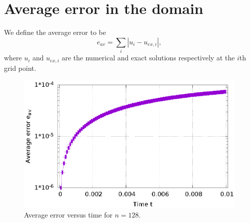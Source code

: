 \documentclass[12pt]{article}
\begin{document}
	\newpage
	
	\section{Average error in the domain}
	We define the average error to be
	\begin{equation}
	e_{av}=\sum_i \left|u_i-u_{ex,i}\right|,
	\end{equation}
	where $u_i$  and $u_{ex,i}$ are the numerical and exact solutions respectively at the $i$th grid point. \\
	
	
	\begin{figure}[H]
		\centering
		\includegraphics[scale=1]{"Gnuplot/Error_vs_time_for_128_grid_points.eps"}
		\caption{Average error versus time for $n=128$.}	
	\end{figure}

	
	
	
	
	
	\appendix
	
	
	
	
\end{document}
